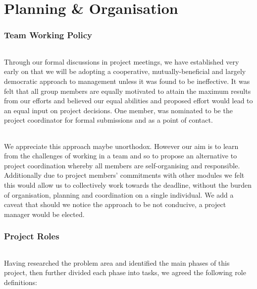 \documentclass[11pt,a4paper]{article}
\begin{document}
\part{Planning \& Organisation}

\section{Team Working Policy}
\paragraph{}
Through our formal discussions in project meetings, we have established very early on that we will be adopting a cooperative, mutually-beneficial and largely democratic approach to management unless it was found to be ineffective.  It was felt that all group members are equally motivated to attain the maximum results from our efforts and believed our equal abilities and proposed effort would lead to an equal input on project decisions.  One member, was nominated to be the project coordinator for formal submissions and as a point of contact.
\paragraph{}
We appreciate this approach maybe unorthodox.  However our aim is to learn from the challenges of working in a team and so to propose an alternative to project coordination whereby all members are self-organising and responsible.  Additionally due to project members’ commitments with other modules we felt this would allow us to collectively work towards the deadline, without the burden of organisation, planning and coordination on a single individual.  We add a caveat that should we notice the approach to be not conducive, a project manager would be elected.

\section{Project Roles}
\paragraph{}
Having researched the problem area and identified the main phases of this project, then further divided each phase into tasks, we agreed the following role definitions:
\end{document}
